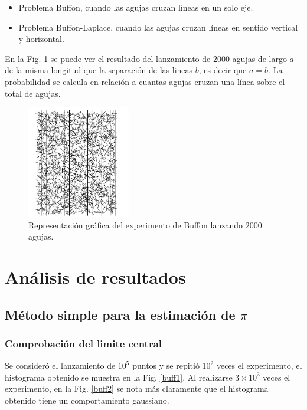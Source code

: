 \documentclass{rbf}
\begin{document}
\begin{itemize}
    \item Problema Buffon, cuando las agujas cruzan líneas en un solo eje.
    \item Problema Buffon-Laplace, cuando las agujas cruzan líneas en sentido vertical y horizontal.
\end{itemize}



En la Fig. \ref{buff} se puede ver el resultado del lanzamiento de $2000$ agujas de largo $a$ de la misma longitud que la separación de las lineas $b$, es decir que $a=b$. La probabilidad se calcula en relación a cuantas agujas cruzan una línea sobre el total de agujas. 

\begin{figure}[tbp!]
 \centering
  \includegraphics[width=0.4\textwidth]{figures/buffon.jpg}
    \caption{Representación gráfica del experimento de Buffon lanzando $2000$ agujas.\cite{krauth}}
 \label{buff}
\end{figure}

\section{Análisis de resultados}
\subsection{Método simple para la estimación de $\pi$}
\subsubsection{Comprobación del limite central}

Se consideró el lanzamiento de $10^5$ puntos y se repitió $10^2$ veces el experimento, el histograma obtenido se muestra en la Fig. \ref{buff1}. Al realizarse $3 \times 10^3$ veces el experimento, en la Fig. \ref{buff2} se nota más claramente que el histograma obtenido tiene un comportamiento gaussiano.
\end{document}
